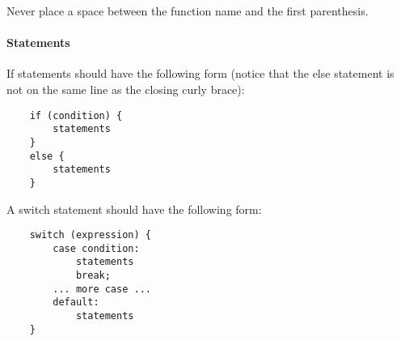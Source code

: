 Never place a space between the function name and the first parenthesis.

\paragraph{Statements} \hspace{1mm}

If statements should have the following form (notice that the else statement is
not on the same line as the closing curly brace):

\begin{lstlisting}
	if (condition) {
		statements
	}
	else {
		statements
	}
\end{lstlisting}

A switch statement should have the following form:

\begin{lstlisting}
	switch (expression) {
		case condition:
			statements
			break;
		... more case ...
		default:
			statements
	}
\end{lstlisting}
